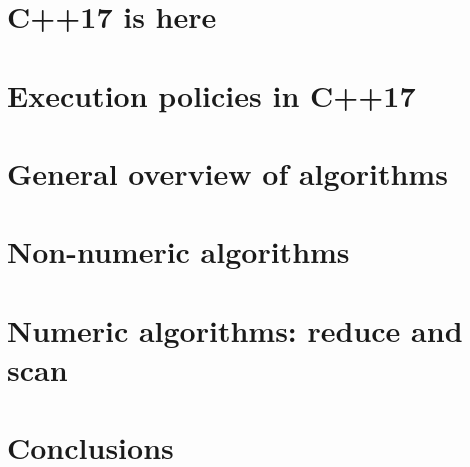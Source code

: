 \section{C++17 is here}


\section{Execution policies in C++17}


\section{General overview of algorithms}


\section{Non-numeric algorithms}


\section{Numeric algorithms: reduce and scan}


\section{Conclusions}


